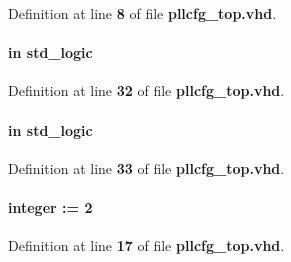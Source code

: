 Definition at line {\bf 8} of file {\bf pllcfg\+\_\+top.\+vhd}.

\paragraph[{lreset}]{ {\bfseries \textcolor{keywordflow}{in}\textcolor{vhdlchar}{ }} {\bfseries \textcolor{comment}{std\+\_\+logic}\textcolor{vhdlchar}{ }} \hspace{0.3cm}{\ttfamily [Port]}}\label{classpllcfg__top_ab4573fdea1cdc3308c947af523ca0d97}


Definition at line {\bf 32} of file {\bf pllcfg\+\_\+top.\+vhd}.

\paragraph[{mreset}]{ {\bfseries \textcolor{keywordflow}{in}\textcolor{vhdlchar}{ }} {\bfseries \textcolor{comment}{std\+\_\+logic}\textcolor{vhdlchar}{ }} \hspace{0.3cm}{\ttfamily [Port]}}\label{classpllcfg__top_a3f01f53cfe06b99a7bfa97b24503f39b}


Definition at line {\bf 33} of file {\bf pllcfg\+\_\+top.\+vhd}.

\paragraph[{n\+\_\+pll}]{ {\bfseries \textcolor{vhdlchar}{ }} {\bfseries \textcolor{comment}{integer}\textcolor{vhdlchar}{ }\textcolor{vhdlchar}{ }\textcolor{vhdlchar}{\+:}\textcolor{vhdlchar}{=}\textcolor{vhdlchar}{ }\textcolor{vhdlchar}{ } \textcolor{vhdldigit}{2} \textcolor{vhdlchar}{ }} \hspace{0.3cm}{\ttfamily [Generic]}}\label{classpllcfg__top_ad18d3aacd0b439077f1b56d0a99cd33e}


Definition at line {\bf 17} of file {\bf pllcfg\+\_\+top.\+vhd}.

